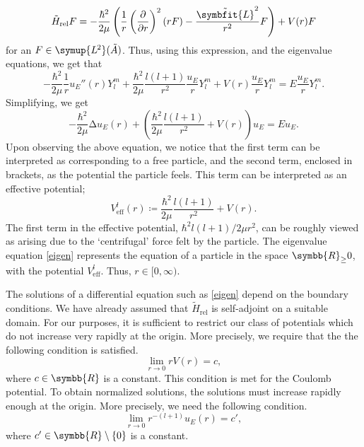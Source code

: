 \documentclass[12pt, a4 paper]{article}
\theoremstyle{definition}
\newcommand{\ltwo}{\symup{L\kern-0.5pt^2}}
\newcommand{\rr}{\symbb{R}}
\newcommand{\lap}{∆}
\newcommand{\lvecsquare}{\tilde{\symbfit{L}}^2}
\newcommand{\hrel}{\tilde{H}_\text{rel}}
\newcommand{\ltwoa}{\ltwo(\tilde{A})}
\newcommand{\sphe}{Y_l^m}
\begin{document}
    \[
        \tilde{H}_\text{rel} F = -\frac{\hbar^2}{2\mu}\left(\frac{1}{r}\left(\frac{\partial}{\partial r}\right)^2 (rF) - \frac{\lvecsquare}{r^2}F\right) + V(r)F
    \]
    for an \(F \in \ltwoa\). Thus, using this expression, and the eigenvalue equations, we get that
    \[
        -\frac{\hbar^2}{2\mu} \frac{1}{r} u_E''(r) \sphe + \frac{\hbar^2}{2\mu} \frac{l(l+1)}{r^2} \frac{u_E}{r} \sphe + V(r) \frac{u_E}{r} \sphe = E \frac{u_E}{r} \sphe.
    \]
    Simplifying, we get
    \[
        -\frac{\hbar^2}{2\mu} \lap u_E(r) + \left(\frac{\hbar^2}{2\mu} \frac{l(l+1)}{r^2} + V(r)\right) u_E = E u_E.\tag{\textasteriskcentered}\label{eigen}
    \]
    Upon observing the above equation, we notice that the first term can be interpreted as corresponding to a free particle, and the second term, enclosed in brackets, as the potential the particle feels. This term can be interpreted as an effective potential;
    \[
        V^l_{\text{eff}} (r) \coloneq \frac{\hbar^2}{2\mu} \frac{l(l+1)}{r^2} + V(r).
    \]
    The first term in the effective potential, \(\hbar^2 l(l+1)/2\mu r^2\), can be roughly viewed as arising due to the `centrifugal' force felt by the particle. The eigenvalue equation \eqref{eigen} represents the equation of a particle in the space \(\rr_{\geq}0\), with the potential \(V^l_{\text{eff}}\). Thus, \(r \in [0, \infty)\).

    The solutions of a differential equation such as \eqref{eigen} depend on the boundary conditions. We have already assumed that \(\hrel\) is self-adjoint on a suitable domain. For our purposes, it is sufficient to restrict our class of potentials which do not increase very rapidly at the origin. More precisely, we require that the the following condition is satisfied.
    \[
        \lim_{r \rightarrow 0} rV(r) = c,
    \]
    where \(c \in \rr\) is a constant. This condition is met for the Coulomb potential. To obtain normalized solutions, the solutions must increase rapidly enough at the origin. More precisely, we need the following condition.
    \[
        \lim_{r \rightarrow 0} r^{-(l+1)} u_E(r) = c',
    \]
    where \(c' \in \rr\setminus\{0\}\) is a constant.

    \nocite{*}
    \printbibliography[heading=bibintoc]
    \printindex
\end{document}
